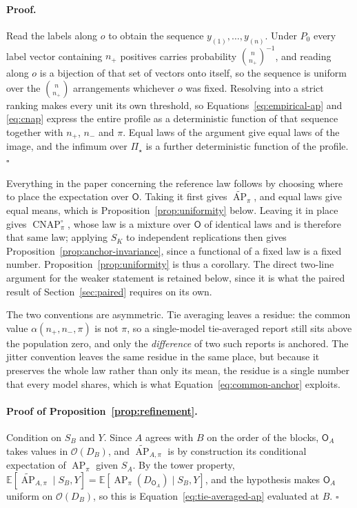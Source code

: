 \documentclass[11pt]{article}
\newcommand{\AP}{\operatorname{AP}}
\newcommand{\CNAP}{\operatorname{CNAP}}
\newcommand{\PSet}{\Pi_\star}
\newcommand{\E}{\mathbb{E}}
\newcommand{\APta}{\widetilde{\AP}}
\newcommand{\Rank}{\mathsf{O}}
\newcommand{\CNAPj}{\CNAP^{\circ}}
\theoremstyle{remark}
\begin{document}
\paragraph{Proof.}
Read the labels along $o$ to obtain the sequence $y_{(1)},\ldots,y_{(n)}$. Under $P_0$ every label vector containing $n_+$ positives carries probability $\binom{n}{n_+}^{-1}$, and reading along $o$ is a bijection of that set of vectors onto itself, so the sequence is uniform over the $\binom{n}{n_+}$ arrangements whichever $o$ was fixed. Resolving into a strict ranking makes every unit its own threshold, so Equations~\eqref{eq:empirical-ap} and \eqref{eq:cnap} express the entire profile as a deterministic function of that sequence together with $n_+$, $n_-$ and $\pi$. Equal laws of the argument give equal laws of the image, and the infimum over $\PSet$ is a further deterministic function of the profile. $\square$

Everything in the paper concerning the reference law follows by choosing where to place the expectation over $\Rank$. Taking it first gives $\APta_\pi$, and equal laws give equal means, which is Proposition~\ref{prop:uniformity} below. Leaving it in place gives $\CNAPj_\pi$, whose law is a mixture over $\Rank$ of identical laws and is therefore that same law; applying $S_K$ to independent replications then gives Proposition~\ref{prop:anchor-invariance}, since a functional of a fixed law is a fixed number. Proposition~\ref{prop:uniformity} is thus a corollary. The direct two-line argument for the weaker statement is retained below, since it is what the paired result of Section~\ref{sec:paired} requires on its own.

The two conventions are asymmetric. Tie averaging leaves a residue: the common value $\alpha(n_+,n_-,\pi)$ is not $\pi$, so a single-model tie-averaged report still sits above the population zero, and only the \emph{difference} of two such reports is anchored. The jitter convention leaves the same residue in the same place, but because it preserves the whole law rather than only its mean, the residue is a single number that every model shares, which is what Equation~\eqref{eq:common-anchor} exploits.

\paragraph{Proof of Proposition~\ref{prop:refinement}.}
Condition on $S_B$ and $Y$. Since $A$ agrees with $B$ on the order of the blocks, $\Rank_A$ takes values in $\mathcal{O}(D_B)$, and $\APta_{A,\pi}$ is by construction its conditional expectation of $\AP_\pi$ given $S_A$. By the tower property, $\E[\APta_{A,\pi}\mid S_B,Y]=\E[\AP_\pi(D_{\Rank_A})\mid S_B,Y]$, and the hypothesis makes $\Rank_A$ uniform on $\mathcal{O}(D_B)$, so this is Equation~\eqref{eq:tie-averaged-ap} evaluated at $B$. $\square$
\end{document}
